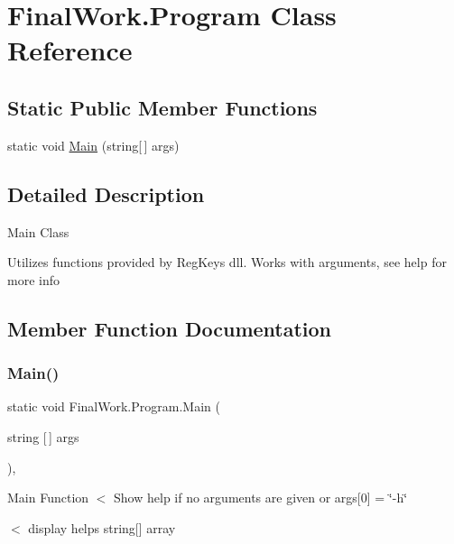 \hypertarget{class_final_work_1_1_program}{}\section{Final\+Work.\+Program Class Reference}
\label{class_final_work_1_1_program}
\subsection*{Static Public Member Functions}
\begin{DoxyCompactItemize}
\item 
static void \hyperlink{class_final_work_1_1_program_af638f741e19f626809c2bf6f2a028e83}{Main} (string\mbox{[}$\,$\mbox{]} args)
\end{DoxyCompactItemize}


\subsection{Detailed Description}
Main Class

Utilizes functions provided by Reg\+Keys dll. Works with arguments, see help for more info 

\subsection{Member Function Documentation}
\hypertarget{class_final_work_1_1_program_af638f741e19f626809c2bf6f2a028e83}{}\label{class_final_work_1_1_program_af638f741e19f626809c2bf6f2a028e83} 
\subsubsection{\texorpdfstring{Main()}{Main()}}
{\footnotesize\ttfamily static void Final\+Work.\+Program.\+Main (\begin{DoxyParamCaption}\item[{string \mbox{[}$\,$\mbox{]}}]{args }\end{DoxyParamCaption})\hspace{0.3cm}{\ttfamily [inline]}, {\ttfamily [static]}}

Main Function $<$ Show help if no arguments are given or args\mbox{[}0\mbox{]} = \char`\"{}-\/h\char`\"{}

$<$ display helps string\mbox{[}\mbox{]} array

